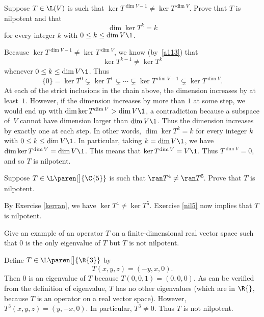 \exercise
Suppose $T \in \L(V)$ is such that $\ker T^{\dim V - 1} \ne \ker T^{\dim V}\!$.  Prove that $T$ is nilpotent and that\label{nil5}
\[
\dim \ker T^k = k
\]
for every integer $k$ with $0 \le k \le \dim V\1$.

\begin{Solution}
Because $\ker T^{\dim V - 1} \ne \ker T^{\dim V}\!$, we know (by~\ref{a113}) that
\[
\ker T^{k-1} \ne \ker T^k
\]
whenever $0 \le k \le \dim V\1$.  Thus
\[
\{0\} = \ker T^0 \subsetneq \ker T^1 \subsetneq \dotsm
\subsetneq \ker T^{\dim V - 1} \subsetneq \ker T^{\dim V}.
\]
At each of the strict inclusions in the chain above, the dimension increases
by at least~$1$.  However, if the dimension increases by more than $1$ at some
step, we would end up with $\dim \ker T^{\dim V} > \dim V\1$, a contradiction
because a subspace of~$V$ cannot have dimension larger than $\dim V\1$.  Thus the
dimension increases by exactly one at each step.  In other words,
$\dim \ker T^k = k$ for every integer $k$ with $0 \le k \le \dim V\1$.  In
particular, taking $k = \dim V\1$, we have $\dim \ker T^{\dim V} = \dim V\1$.  This
means that $\ker T^{\dim V} = V\1$.  Thus $T^{\dim V} = 0$, and so $T$ is nilpotent.
\end{Solution}

\exercise
Suppose $T \in \L\paren[\big]{\C{5}}$ is such that $\ran T^4 \ne \ran T^5\!$.  Prove that $T$ is
nilpotent.

\begin{Solution}
By Exercise \ref{kerran}, we have $\ker T^4 \ne \ker T^5\!$. Exercise \ref{nil5} now implies that $T$ is nilpotent.
\end{Solution}

\exercise
Give an example of an operator $T$ on a finite-dimensional real vector space such that $0$ is the only eigenvalue of $T$ but $T$ is not nilpotent. \label{Nil1}

\begin{Solution}
Define $T \in \L\paren[\big]{\R{3}}$ by
\[
T(x, y, z) = (-y, x, 0).
\]
Then $0$ is an eigenvalue of $T$ because $T(0,0,1) = (0,0,0)$.  As can be
verified from the definition of eigenvalue, $T$ has no other eigenvalues (which
are in $\R{}$, because $T$ is an operator on a real vector space).  However,
$T^3(x,y,z) = (y, -x, 0)$.  In particular, $T^3 \ne 0$.  Thus $T$ is not
nilpotent.
\end{Solution}

